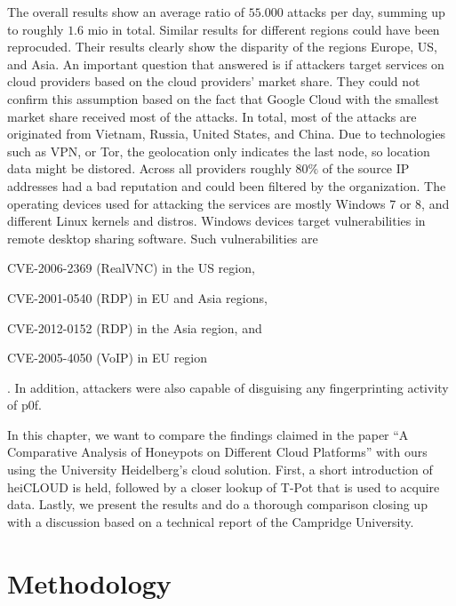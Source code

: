 The overall results show an average ratio of $55.000$ attacks per day, summing up to roughly $1.6$ mio in total.
Similar results for different regions could have been reprocuded.
Their results clearly show the disparity of the regions Europe, US, and Asia.
An important question that \citet{Kelly2021} answered is if attackers target services on cloud providers based on the cloud providers' market share.
They could not confirm this assumption based on the fact that Google Cloud with the smallest market share received most of the attacks.
In total, most of the attacks are originated from Vietnam, Russia, United States, and China.
Due to technologies such as VPN, or Tor, the geolocation only indicates the last node, so location data might be distored.
Across all providers roughly $80\%$ of the source IP addresses had a bad reputation and could been filtered by the organization.
The operating devices used for attacking the services are mostly Windows 7 or 8, and different Linux kernels and distros.
Windows devices target vulnerabilities in remote desktop sharing software. Such vulnerabilities are
\begin{enumerate*}[label=(\roman*)]
    \item CVE-2006-2369\cite{CVE-2006-2369} (RealVNC) in the US region,
    \item CVE-2001-0540\cite{CVE-2001-0540} (RDP) in EU and Asia regions,
    \item CVE-2012-0152\cite{CVE-2012-0152} (RDP) in the Asia region, and
    \item CVE-2005-4050\cite{CVE-2005-4050} (VoIP) in EU region
\end{enumerate*}.
In addition, attackers were also capable of disguising any fingerprinting activity of p0f.

In this chapter, we want to compare the findings \citet{Kelly2021} claimed in the paper \enquote{A Comparative Analysis of Honeypots on Different
    Cloud Platforms} with ours using the University Heidelberg's cloud solution.
First, a short introduction of heiCLOUD is held, followed by a closer lookup of T-Pot that is used to acquire data.
Lastly, we present the results and do a thorough comparison closing up with a discussion based on a technical report of the Campridge University.

\section{Methodology}

